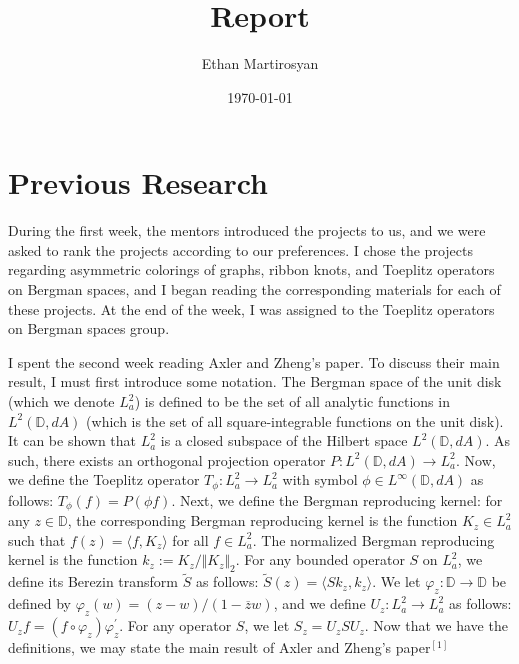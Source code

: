 \documentclass[12pt]{article}
\begin{document}
 
\title{Report}
\author{Ethan Martirosyan}
\date{\today}
\maketitle
{}
\hfuzz=50pt
\section*{Previous Research}
During the first week, the mentors introduced the projects to us, and we were asked to rank the projects according to our preferences. I chose the projects regarding asymmetric colorings of graphs, ribbon knots, and Toeplitz operators on Bergman spaces, and I began reading the corresponding materials for each of these projects. At the end of the week, I was assigned to the Toeplitz operators on Bergman spaces group.
\par I spent the second week reading Axler and Zheng's paper. To discuss their main result, I must first introduce some notation. The Bergman space of the unit disk (which we denote $L_a^2$) is defined to be the set of all analytic functions in $L^2(\mathbb{D},dA)$ (which is the set of all square-integrable functions on the unit disk). It can be shown that $L_a^2$ is a closed subspace of the Hilbert space $L^2(\mathbb{D},dA)$. As such, there exists an orthogonal projection operator $P: L^2(\mathbb{D},dA) \rightarrow L_a^2$. Now, we define the Toeplitz operator $T_\phi: L_a^2 \rightarrow L_a^2$ with symbol $\phi \in L^\infty(\mathbb{D},dA)$ as follows: $T_\phi(f) = P(\phi f)$. Next, we define the Bergman reproducing kernel: for any $z \in \mathbb{D}$, the corresponding Bergman reproducing kernel is the function $K_z \in L_a^2$ such that $f(z) = \langle f, K_z \rangle$ for all $f \in L_a^2$. The normalized Bergman reproducing kernel is the function $k_z := K_z/\Vert K_z \Vert_2$. For any bounded operator $S$ on $L_a^2$, we define its Berezin transform $\tilde{S}$ as follows: $\tilde{S}(z) = \langle Sk_z, k_z \rangle$. We let $\varphi_z: \mathbb{D} \rightarrow \mathbb{D}$ be defined by $\varphi_z(w) = (z-w)/(1-\overline{z}{w})$, and we define $U_z: L_a^2 \rightarrow L_a^2$ as follows: $U_z f = (f \circ \varphi_z)\varphi_z^\prime$. For any operator $S$, we let $S_z = U_z S U_z$. Now that we have the definitions, we may state the main result of Axler and Zheng's paper$^{[1]}$
\end{document}
